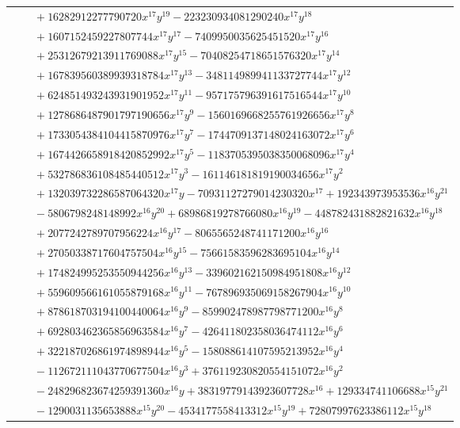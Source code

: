 \documentclass[11pt]{article}
\begin{document}
\begin{longtable}{@{}ll@{}}
 & $\quad +16282912277790720x^{17}y^{19}-223230934081290240x^{17}y^{18}$\\
 & $\quad +1607152459227807744x^{17}y^{17}-7409950035625451520x^{17}y^{16}$\\
 & $\quad +25312679213911769088x^{17}y^{15}-70408254718651576320x^{17}y^{14}$\\
 & $\quad +167839560389939318784x^{17}y^{13}-348114989941133727744x^{17}y^{12}$\\
 & $\quad +624851493243931901952x^{17}y^{11}-957175796391617516544x^{17}y^{10}$\\
 & $\quad +1278686487901797190656x^{17}y^{9}-1560169668255761926656x^{17}y^{8}$\\
 & $\quad +1733054384104415870976x^{17}y^{7}-1744709137148024163072x^{17}y^{6}$\\
 & $\quad +1674426658918420852992x^{17}y^{5}-1183705395038350068096x^{17}y^{4}$\\
 & $\quad +532786836108485440512x^{17}y^{3}-161146181819190034656x^{17}y^{2}$\\
 & $\quad +132039732286587064320x^{17}y-70931127279014230320x^{17}+192343973953536x^{16}y^{21}$\\
 & $\quad -5806798248148992x^{16}y^{20}+68986819278766080x^{16}y^{19}-448782431882821632x^{16}y^{18}$\\
 & $\quad +2077242789707956224x^{16}y^{17}-8065565248741171200x^{16}y^{16}$\\
 & $\quad +27050338717604757504x^{16}y^{15}-75661583596283695104x^{16}y^{14}$\\
 & $\quad +174824995253550944256x^{16}y^{13}-339602162150984951808x^{16}y^{12}$\\
 & $\quad +559609566161055879168x^{16}y^{11}-767896935069158267904x^{16}y^{10}$\\
 & $\quad +878618703194100440064x^{16}y^{9}-859902478987798771200x^{16}y^{8}$\\
 & $\quad +692803462365856963584x^{16}y^{7}-426411802358036474112x^{16}y^{6}$\\
 & $\quad +322187026861974898944x^{16}y^{5}-158088614107595213952x^{16}y^{4}$\\
 & $\quad -112672111043770677504x^{16}y^{3}+376119230820554151072x^{16}y^{2}$\\
 & $\quad -248296823674259391360x^{16}y+38319779143923607728x^{16}+129334741106688x^{15}y^{21}$\\
 & $\quad -1290031135653888x^{15}y^{20}-4534177558413312x^{15}y^{19}+72807997623386112x^{15}y^{18}$\\

\end{longtable}
\end{document}
